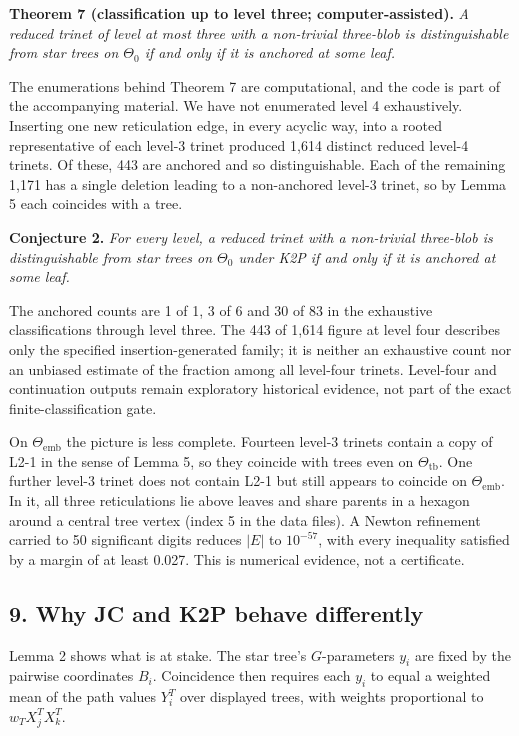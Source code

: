 \documentclass[
  11pt,
]{article}
\begin{document}
\textbf{Theorem 7 (classification up to level three;
computer-assisted).} \emph{A reduced trinet of level at most three with
a non-trivial three-blob is distinguishable from star trees on
\(\Theta_0\) if and only if it is anchored at some leaf.}

The enumerations behind Theorem 7 are computational, and the code is
part of the accompanying material. We have not enumerated level 4
exhaustively. Inserting one new reticulation edge, in every acyclic way,
into a rooted representative of each level-3 trinet produced 1,614
distinct reduced level-4 trinets. Of these, 443 are anchored and so
distinguishable. Each of the remaining 1,171 has a single deletion
leading to a non-anchored level-3 trinet, so by Lemma 5 each coincides
with a tree.

\textbf{Conjecture 2.} \emph{For every level, a reduced trinet with a
non-trivial three-blob is distinguishable from star trees on
\(\Theta_0\) under K2P if and only if it is anchored at some leaf.}

The anchored counts are 1 of 1, 3 of 6 and 30 of 83 in the exhaustive
classifications through level three. The 443 of 1,614 figure at level
four describes only the specified insertion-generated family; it is
neither an exhaustive count nor an unbiased estimate of the fraction
among all level-four trinets. Level-four and continuation outputs remain
exploratory historical evidence, not part of the exact
finite-classification gate.

On \(\Theta_{\mathrm{emb}}\) the picture is less complete. Fourteen
level-3 trinets contain a copy of L2-1 in the sense of Lemma 5, so they
coincide with trees even on \(\Theta_{\mathrm{tb}}\). One further
level-3 trinet does not contain L2-1 but still appears to coincide on
\(\Theta_{\mathrm{emb}}\). In it, all three reticulations lie above
leaves and share parents in a hexagon around a central tree vertex
(index 5 in the data files). A Newton refinement carried to 50
significant digits reduces \(|E|\) to \(10^{-57}\), with every
inequality satisfied by a margin of at least 0.027. This is numerical
evidence, not a certificate.

\subsection{9. Why JC and K2P behave
differently}\label{why-jc-and-k2p-behave-differently}

Lemma 2 shows what is at stake. The star tree's \(G\)-parameters \(y_i\)
are fixed by the pairwise coordinates \(B_i\). Coincidence then requires
each \(y_i\) to equal a weighted mean of the path values \(Y_i^T\) over
displayed trees, with weights proportional to \(w_TX_j^TX_k^T\).
\end{document}
